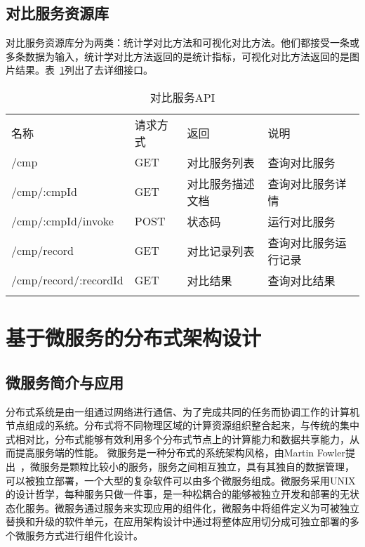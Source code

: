 \subsection{对比服务资源库}
对比服务资源库分为两类：统计学对比方法和可视化对比方法。他们都接受一条或多条数据为输入，统计学对比方法返回的是统计指标，可视化对比方法返回的是图片结果。表~\ref{tab:cmp-service-API}列出了去详细接口。

\begin{table}[!htbp]
    \centering
    \caption{对比服务API}
    \label{tab:cmp-service-API}
    \begin{tabular}{llll}
        \Xhline{1.5pt}
        名称 & 请求方式 & 返回 & 说明 \\
        \Xhline{1.5pt}
        /cmp & GET & 对比服务列表 & 查询对比服务 \\
        /cmp/:cmpId & GET & 对比服务描述文档 & 查询对比服务详情 \\
        /cmp/:cmpId/invoke & POST & 状态码 & 运行对比服务 \\ 
        /cmp/record & GET & 对比记录列表 & 查询对比服务运行记录 \\
        /cmp/record/:recordId & GET & 对比结果 & 查询对比结果 \\
        \Xhline{1.5pt}
    \end{tabular}
\end{table}

\section{基于微服务的分布式架构设计}
\subsection{微服务简介与应用}
分布式系统是由一组通过网络进行通信、为了完成共同的任务而协调工作的计算机节点组成的系统。分布式将不同物理区域的计算资源组织整合起来，与传统的集中式相对比，分布式能够有效利用多个分布式节点上的计算能力和数据共享能力，从而提高服务端的性能。
微服务是一种分布式的系统架构风格，由Martin Fowler提出~\cite{fowler2014microservices}，微服务是颗粒比较小的服务，服务之间相互独立，具有其独自的数据管理，可以被独立部署，一个大型的复杂软件可以由多个微服务组成。微服务采用UNIX的设计哲学，每种服务只做一件事，是一种松耦合的能够被独立开发和部署的无状态化服务。微服务通过服务来实现应用的组件化，微服务中将组件定义为可被独立替换和升级的软件单元，在应用架构设计中通过将整体应用切分成可独立部署的多个微服务方式进行组件化设计。

